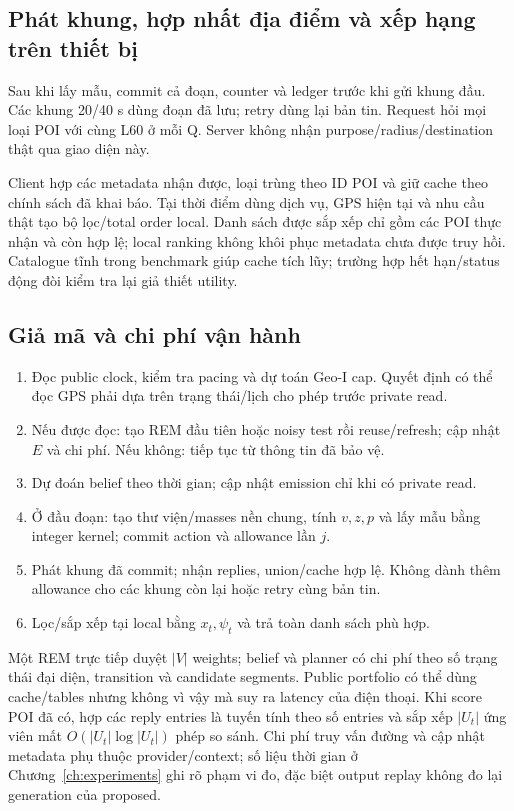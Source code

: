 \subsection{Phát khung, hợp nhất địa điểm và xếp hạng trên thiết bị}
Sau khi lấy mẫu, commit cả đoạn, counter và ledger trước khi gửi khung đầu. Các khung 20/40 s dùng
đoạn đã lưu; retry dùng lại bản tin. Request hỏi mọi loại POI với cùng L60 ở mỗi Q. Server không
nhận purpose/radius/destination thật qua giao diện này.

Client hợp các metadata nhận được, loại trùng theo ID POI và giữ cache theo chính sách đã khai báo.
Tại thời điểm dùng dịch vụ, GPS hiện tại và nhu cầu thật tạo bộ lọc/total order local. Danh sách
được sắp xếp chỉ gồm các POI thực nhận và còn hợp lệ; local ranking không khôi phục metadata chưa
được truy hồi. Catalogue tĩnh trong benchmark giúp cache tích lũy; trường hợp hết hạn/status động
đòi kiểm tra lại giả thiết utility.

\subsection{Giả mã và chi phí vận hành}
\begin{enumerate}
\item Đọc public clock, kiểm tra pacing và dự toán Geo-I cap. Quyết định có thể đọc GPS phải dựa
trên trạng thái/lịch cho phép trước private read.
\item Nếu được đọc: tạo REM đầu tiên hoặc noisy test rồi reuse/refresh; cập nhật $E$ và chi phí.
Nếu không: tiếp tục từ thông tin đã bảo vệ.
\item Dự đoán belief theo thời gian; cập nhật emission chỉ khi có private read.
\item Ở đầu đoạn: tạo thư viện/masses nền chung, tính $v,z,p$ và lấy mẫu bằng integer kernel;
commit action và allowance lần $j$.
\item Phát khung đã commit; nhận replies, union/cache hợp lệ. Không dành thêm allowance cho các
khung còn lại hoặc retry cùng bản tin.
\item Lọc/sắp xếp tại local bằng $x_t,\psi_t$ và trả toàn danh sách phù hợp.
\end{enumerate}

Một REM trực tiếp duyệt $|V|$ weights; belief và planner có chi phí theo số trạng thái đại diện,
transition và candidate segments. Public portfolio có thể dùng cache/tables nhưng không vì vậy
mà suy ra latency của điện thoại. Khi score POI đã có, hợp các reply entries là tuyến tính theo số
entries và sắp xếp $|U_t|$ ứng viên mất $O(|U_t|\log|U_t|)$ phép so sánh. Chi phí truy vấn đường và
cập nhật metadata phụ thuộc provider/context; số liệu thời gian ở Chương~\ref{ch:experiments} ghi rõ
phạm vi đo, đặc biệt output replay không đo lại generation của proposed.

